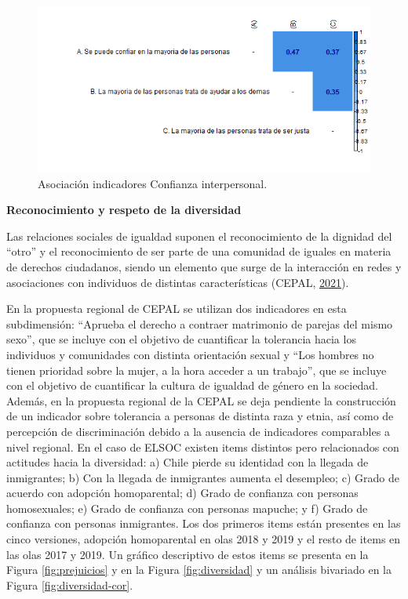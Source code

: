 \documentclass[
  12pt,
]{book}
\begin{document}
\begin{figure}[H]

{\centering \includegraphics[width=1\linewidth,height=1\textheight]{output/graphs/confianza-interpersonal_cor} 

}

\caption{Asociación indicadores Confianza interpersonal.}\label{fig:confianza-interpersonal-cor}
\end{figure}

\textbf{Reconocimiento y respeto de la diversidad}

Las relaciones sociales de igualdad suponen el reconocimiento de la dignidad del ``otro'' y el reconocimiento de ser parte de una comunidad de iguales en materia de derechos ciudadanos, siendo un elemento que surge de la interacción en redes y asociaciones con individuos de distintas características (CEPAL, \protect\hyperlink{ref-cepal_cohesion_2021}{2021}).

En la propuesta regional de CEPAL se utilizan dos indicadores en esta subdimensión: ``Aprueba el derecho a contraer matrimonio de parejas del mismo sexo'', que se incluye con el objetivo de cuantificar la tolerancia hacia los individuos y comunidades con distinta orientación sexual y ``Los hombres no tienen prioridad sobre la mujer, a la hora acceder a un trabajo'', que se incluye con el objetivo de cuantificar la cultura de igualdad de género en la sociedad. Además, en la propuesta regional de la CEPAL se deja pendiente la construcción de un indicador sobre tolerancia a personas de distinta raza y etnia, así como de percepción de discriminación debido a la ausencia de indicadores comparables a nivel regional. En el caso de ELSOC existen items distintos pero relacionados con actitudes hacia la diversidad: a) Chile pierde su identidad con la llegada de inmigrantes; b) Con la llegada de inmigrantes aumenta el desempleo; c) Grado de acuerdo con adopción homoparental; d) Grado de confianza con personas homosexuales; e) Grado de confianza con personas mapuche; y f) Grado de confianza con personas inmigrantes. Los dos primeros items están presentes en las cinco versiones, adopción homoparental en olas 2018 y 2019 y el resto de items en las olas 2017 y 2019. Un gráfico descriptivo de estos items se presenta en la Figura \ref{fig:prejuicios} y en la Figura \ref{fig:diversidad} y un análisis bivariado en la Figura \ref{fig:diversidad-cor}.
\end{document}
